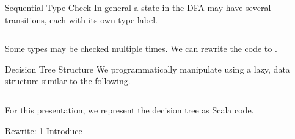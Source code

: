 \newsavebox\typecaseKbox
\begin{lrbox}{\typecaseKbox}
  \begin{minipage}{8cm}
    
  \end{minipage}
\end{lrbox}


\newsavebox\typecaseKhbox
\begin{lrbox}{\typecaseKhbox}
  \begin{minipage}{8cm}
    
  \end{minipage}
\end{lrbox}



\begin{frame}{Sequential Type Check}
  In general a state in the DFA may have several  transitions, each with its own type label.
  \begin{columns}
    \begin{column}{0.5\textwidth}
      \usebox\typecaseAbox
    \end{column}
    \begin{column}{0.5\textwidth}  %
      \scalebox{0.9}{}
    \end{column}    
  \end{columns}

  Some types may be checked multiple times.  We can rewrite the code to .
\end{frame}

\begin{frame}{Decision Tree Structure}
  We programmatically manipulate  using a lazy,  data structure similar to the following.

  \begin{columns}
    \begin{column}{0.5\textwidth}
      \usebox\typecaseAbox
    \end{column}
    \begin{column}{0.5\textwidth}  %
      \usebox\typecaseITEbox
    \end{column}    
  \end{columns}

  For this presentation, we represent the decision tree as  Scala code.
\end{frame}



\begin{frame}{Rewrite: 1}
  Introduce \colorbox{pink!30}{}

  \begin{columns}
    \begin{column}{0.5\textwidth}
      \usebox\typecaseAbox
    \end{column}
    \begin{column}{0.5\textwidth}  %
    \end{column}    
  \end{columns}
\end{frame}

